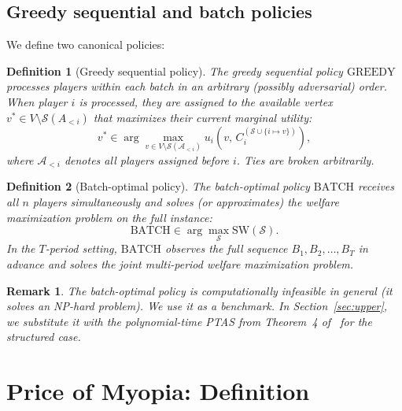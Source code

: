\documentclass[11pt]{article}
\newtheorem{definition}{Definition}
\newtheorem{remark}{Remark}
\newcommand{\SW}{\mathrm{SW}}
\newcommand{\GREEDY}{\mathrm{GREEDY}}
\newcommand{\BATCH}{\mathrm{BATCH}}
\newcommand{\A}{\mathcal{A}}
\begin{document}
\subsection{Greedy sequential and batch policies}

We define two canonical policies:

\begin{definition}[Greedy sequential policy]
  \label{def:greedy}
  The \emph{greedy sequential} policy $\GREEDY$ processes players within each batch
  in an arbitrary (possibly adversarial) order.
  When player $i$ is processed, they are assigned to the available vertex
  $v^* \in V \setminus \mathcal{S}(A_{<i})$ that maximizes their \emph{current}
  marginal utility:
  \begin{equation}
    v^* \in \arg\max_{v \in V \setminus \mathcal{S}(\A_{<i})}
    u_i\!\left(v,\, C_i^{(\mathcal{S} \cup \{i \mapsto v\})}\right),
  \end{equation}
  where $\A_{<i}$ denotes all players assigned before $i$.
  Ties are broken arbitrarily.
\end{definition}

\begin{definition}[Batch-optimal policy]
  \label{def:batch}
  The \emph{batch-optimal} policy $\BATCH$ receives all $n$ players simultaneously
  and solves (or approximates) the welfare maximization problem on the full instance:
  \begin{equation}
    \BATCH \in \arg\max_\mathcal{S} \SW(\mathcal{S}).
  \end{equation}
  In the $T$-period setting, $\BATCH$ observes the full sequence
  $B_1, B_2, \ldots, B_T$ in advance and solves the joint multi-period welfare
  maximization problem.
\end{definition}

\begin{remark}
  The batch-optimal policy is computationally infeasible in general (it solves an
  NP-hard problem).
  We use it as a benchmark.
  In Section~\ref{sec:upper}, we substitute it with the polynomial-time PTAS from
  Theorem~4 of~\cite{qiu2025welfare} for the structured case.
\end{remark}

\section{Price of Myopia: Definition}
\label{sec:pom}
\end{document}
